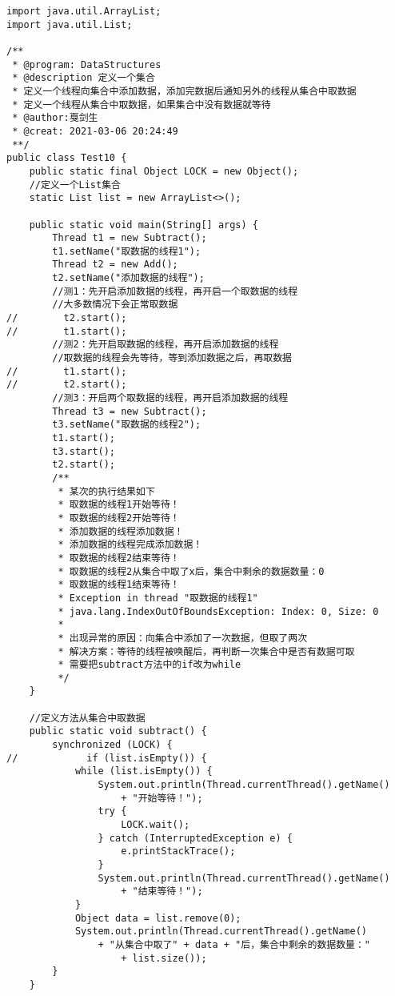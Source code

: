 \documentclass[a4paper]{report}
\begin{document}
\begin{Verbatim}[frame=single,numbersep=5pt,xleftmargin=1.5em,xrightmargin=1.5em]
import java.util.ArrayList;
import java.util.List;

/**
 * @program: DataStructures
 * @description 定义一个集合
 * 定义一个线程向集合中添加数据，添加完数据后通知另外的线程从集合中取数据
 * 定义一个线程从集合中取数据，如果集合中没有数据就等待
 * @author:戛剑生
 * @creat: 2021-03-06 20:24:49
 **/
public class Test10 {
    public static final Object LOCK = new Object();
    //定义一个List集合
    static List list = new ArrayList<>();

    public static void main(String[] args) {
        Thread t1 = new Subtract();
        t1.setName("取数据的线程1");
        Thread t2 = new Add();
        t2.setName("添加数据的线程");
        //测1：先开启添加数据的线程，再开启一个取数据的线程
        //大多数情况下会正常取数据
//        t2.start();
//        t1.start();
        //测2：先开启取数据的线程，再开启添加数据的线程
        //取数据的线程会先等待，等到添加数据之后，再取数据
//        t1.start();
//        t2.start();
        //测3：开启两个取数据的线程，再开启添加数据的线程
        Thread t3 = new Subtract();
        t3.setName("取数据的线程2");
        t1.start();
        t3.start();
        t2.start();
        /**
         * 某次的执行结果如下
         * 取数据的线程1开始等待！
         * 取数据的线程2开始等待！
         * 添加数据的线程添加数据！
         * 添加数据的线程完成添加数据！
         * 取数据的线程2结束等待！
         * 取数据的线程2从集合中取了x后，集合中剩余的数据数量：0
         * 取数据的线程1结束等待！
         * Exception in thread "取数据的线程1" 
         * java.lang.IndexOutOfBoundsException: Index: 0, Size: 0
         *
         * 出现异常的原因：向集合中添加了一次数据，但取了两次
         * 解决方案：等待的线程被唤醒后，再判断一次集合中是否有数据可取
         * 需要把subtract方法中的if改为while
         */
    }

    //定义方法从集合中取数据
    public static void subtract() {
        synchronized (LOCK) {
//            if (list.isEmpty()) {
            while (list.isEmpty()) {
                System.out.println(Thread.currentThread().getName() 
                    + "开始等待！");
                try {
                    LOCK.wait();
                } catch (InterruptedException e) {
                    e.printStackTrace();
                }
                System.out.println(Thread.currentThread().getName() 
                    + "结束等待！");
            }
            Object data = list.remove(0);
            System.out.println(Thread.currentThread().getName() 
                + "从集合中取了" + data + "后，集合中剩余的数据数量：" 
                    + list.size());
        }
    }


\end{Verbatim}
\end{document}
